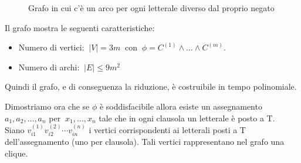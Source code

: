 \documentclass[a4paper]{article}
\theoremstyle{definition}
\begin{document}
		\begin{figure}[h!]
			\centering
			\caption{Grafo in cui c'è un arco per ogni letterale diverso dal proprio negato}
		\end{figure}
		
		Il grafo mostra le seguenti caratteristiche:
		\begin{itemize}
			\item Numero di vertici: $\ \vert V \vert = 3m \ $ con $ \ \phi = C^{(1)}\wedge\dots\wedge C^{(m)} $.
			\item Numero di archi: $ \ \vert E \vert \leq 9m^2 $
		\end{itemize}
		Quindi il grafo, e di conseguenza la riduzione, è costruibile in tempo polinomiale.
		
		\bigskip
		
		Dimostriamo ora che se $ \phi $ è soddisfacibile allora esiste un assegnamento $ a_1, a_2,\dots, a_n $ per $\ x_1, \dots, x_n $ tale che in ogni clausola un letterale è posto a T.\\
		Siano $ v_{i1}^{(1)} v_{i2}^{(2)}\cdots v_{in}^{(n)} $ i vertici corrispondenti ai letterali posti a T dell'assegnamento (uno per clausola). Tali vertici rappresentano nel grafo una clique.
		
		\bigskip
		
\end{document}
